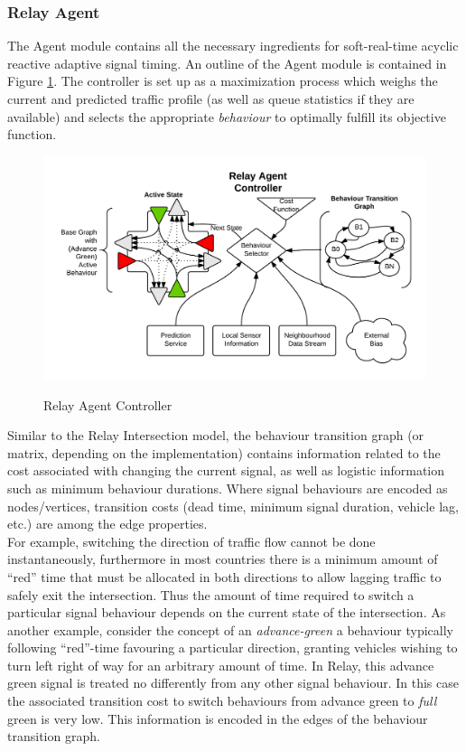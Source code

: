 \documentclass{article}
\begin{document}
\subsubsection{Relay Agent}
The Agent module contains all the necessary ingredients for soft-real-time acyclic reactive adaptive signal timing.
An outline of the Agent module is contained in Figure \ref{fig:Relay_Agent_Controller}.
The controller is set up as a maximization process which weighs the current and predicted traffic profile (as well as queue statistics if they are available) and selects the appropriate \emph{behaviour} to optimally fulfill its objective function.\\

\begin{figure}[!htpb]
	\caption{Relay Agent Controller}
	\includegraphics[width=\textwidth]{figures/Relay_Agent_Controller.png}
	\label{fig:Relay_Agent_Controller}
\end{figure}

Similar to the Relay Intersection model, the behaviour transition graph (or matrix, depending on the implementation) contains information related to the cost associated with changing the current signal, as well as logistic information such as minimum behaviour durations.
Where signal behaviours are encoded as nodes/vertices, transition costs (dead time, minimum signal duration, vehicle lag, etc.) are among the edge properties.\\

For example, switching the direction of traffic flow cannot be done instantaneously, furthermore in most countries there is a minimum amount of ``red'' time that must be allocated in both directions to allow lagging traffic to safely exit the intersection.
Thus the amount of time required to switch a particular signal behaviour depends on the current state of the intersection.
As another example, consider the concept of an \emph{advance-green} a behaviour typically following ``red''-time favouring a particular direction, granting vehicles wishing to turn left right of way for an arbitrary amount of time.
In Relay, this advance green signal is treated no differently from any other signal behaviour.
In this case the associated transition cost to switch behaviours from advance green to \emph{full} green is very low.
This information is encoded in the edges of the behaviour transition graph.\\
\end{document}
